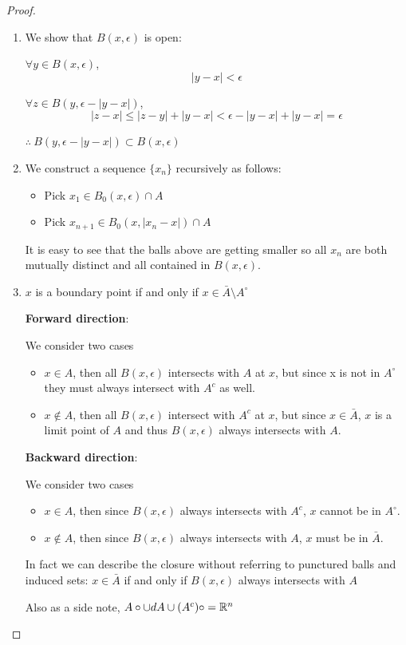 \begin{proof} \ {\\}
\begin{enumerate}
\item We show that $B(x,\epsilon)$ is open:

$\forall y \in B(x,\epsilon)$, 
\[ |y-x|<\epsilon \]

$\forall z \in B(y,\epsilon-|y-x|)$, 
\[ |z-x|\le|z-y|+|y-x|<\epsilon-|y-x|+|y-x|=\epsilon \]

$\therefore\:B(y,\epsilon-|y-x|) \subset B(x,\epsilon)$

\item We construct a sequence $\{x_n\}$ recursively as follows:
\begin{itemize}
\item Pick $x_1 \in B_0(x,\epsilon) \cap A$
\item Pick $x_{n+1} \in B_0(x,|x_n-x|) \cap A$
\end{itemize}
It is easy to see that the balls above are getting smaller so all $x_n$ are both mutually distinct and all contained in $B(x,\epsilon)$.

\item $x$ is a boundary point if and only if $x \in \bar{A} \setminus A^\circ$

\textbf{Forward direction}: 

We consider two cases
\begin{itemize}
\item $x \in A$, then all $B(x,\epsilon)$ intersects with $A$ at $x$, but since x is not in $A^\circ$ they must always intersect with $A^c$ as well.
\item $x \notin A$, then all $B(x,\epsilon)$ intersect with $A^c$ at $x$, but since $x \in \bar{A}$, $x$ is a limit point of $A$ and thus $B(x,\epsilon)$ always intersects with $A$.
\end{itemize}

\textbf{Backward direction}:

We consider two cases
\begin{itemize}
\item $x \in A$, then since $B(x,\epsilon)$ always intersects with $A^c$, $x$ cannot be in $A^\circ$.
\item $x \notin A$, then since $B(x,\epsilon)$ always intersects with $A$, $x$ must be in $\bar{A}$.
\end{itemize}

In fact we can describe the closure without referring to punctured balls and induced sets:
$x \in \bar{A}$ if and only if $B(x,\epsilon)$ always intersects with $A$

Also as a side note, $A\circ\cup dA\cup (A^c)\circ=\mathbb R^n$
\end{enumerate}
\end{proof}

